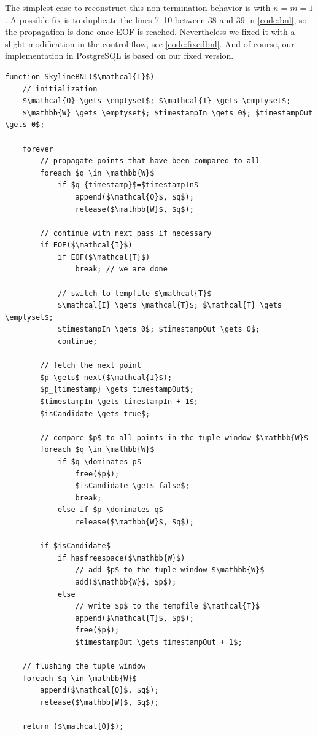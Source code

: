 The simplest case to reconstruct this non-termination behavior is with
$n=m=1$.  A possible fix is to duplicate the lines 7--10 between 38
and 39 in \autoref{code:bnl}, so the propagation is done once EOF
is reached.  Nevertheless we fixed it with a slight modification in
the control flow, see \autoref{code:fixedbnl}.  And of course, our
implementation in PostgreSQL is based on our fixed version.

\begin{lstlisting}[language=pseudo,
caption={Pseudo-code for Fixed Block-Nested-Loops (BNL) Algorithm},
label={code:fixedbnl}
]
function SkylineBNL($\mathcal{I}$) 
	// initialization
	$\mathcal{O} \gets \emptyset$; $\mathcal{T} \gets \emptyset$;
	$\mathbb{W} \gets \emptyset$; $timestampIn \gets 0$; $timestampOut
\gets 0$;

	forever
		// propagate points that have been compared to all
		foreach $q \in \mathbb{W}$
			if $q_{timestamp}$=$timestampIn$
				append($\mathcal{O}$, $q$);
				release($\mathbb{W}$, $q$);

		// continue with next pass if necessary
		if EOF($\mathcal{I}$)
			if EOF($\mathcal{T}$)
				break; // we are done

			// switch to tempfile $\mathcal{T}$
			$\mathcal{I} \gets \mathcal{T}$; $\mathcal{T} \gets \emptyset$;
			$timestampIn \gets 0$; $timestampOut \gets 0$;
			continue;

		// fetch the next point
		$p \gets$ next($\mathcal{I}$);
		$p_{timestamp} \gets timestampOut$;
		$timestampIn \gets timestampIn + 1$;
		$isCandidate \gets true$;

		// compare $p$ to all points in the tuple window $\mathbb{W}$
		foreach $q \in \mathbb{W}$
			if $q \dominates p$
				free($p$);
				$isCandidate \gets false$;
				break;
			else if $p \dominates q$
				release($\mathbb{W}$, $q$);

		if $isCandidate$
			if hasfreespace($\mathbb{W}$)
				// add $p$ to the tuple window $\mathbb{W}$
				add($\mathbb{W}$, $p$);
			else
				// write $p$ to the tempfile $\mathcal{T}$
				append($\mathcal{T}$, $p$);
				free($p$);
				$timestampOut \gets timestampOut + 1$;

	// flushing the tuple window
	foreach $q \in \mathbb{W}$
		append($\mathcal{O}$, $q$);
		release($\mathbb{W}$, $q$);

	return ($\mathcal{O}$);
\end{lstlisting}

